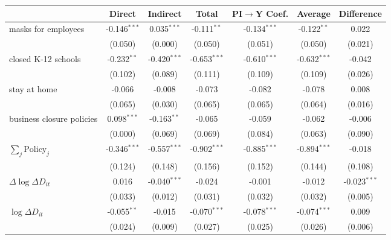 
\begin{tabular}{lccccc|>{}c}
\toprule
  & Direct & Indirect & Total & PI$\to$Y Coef. & Average & Difference\\
\midrule
masks for employees & -0.146$^{***}$ & 0.035$^{***}$ & -0.111$^{**}$ & -0.134$^{***}$ & -0.122$^{**}$ & 0.022\\
 & (0.050) & (0.000) & (0.050) & (0.051) & (0.050) & (0.021)\\
closed K-12 schools & -0.232$^{**}$ & -0.420$^{***}$ & -0.653$^{***}$ & -0.610$^{***}$ & -0.632$^{***}$ & -0.042\\
 & (0.102) & (0.089) & (0.111) & (0.109) & (0.109) & (0.026)\\
stay at home & -0.066 & -0.008 & -0.073 & -0.082 & -0.078 & 0.008\\
 & (0.065) & (0.030) & (0.065) & (0.065) & (0.064) & (0.016)\\
business closure policies & 0.098$^{***}$ & -0.163$^{**}$ & -0.065 & -0.059 & -0.062 & -0.006\\
 & (0.000) & (0.069) & (0.069) & (0.084) & (0.063) & (0.090)\\
$\sum_j \mathrm{Policy}_j$ & -0.346$^{***}$ & -0.557$^{***}$ & -0.902$^{***}$ & -0.885$^{***}$ & -0.894$^{***}$ & -0.018\\
 & (0.124) & (0.148) & (0.156) & (0.152) & (0.144) & (0.108)\\
$\Delta \log \Delta D_{it}$ & 0.016 & -0.040$^{***}$ & -0.024 & -0.001 & -0.012 & -0.023$^{***}$\\
 & (0.033) & (0.012) & (0.031) & (0.032) & (0.032) & (0.005)\\
$\log \Delta D_{it}$ & -0.055$^{**}$ & -0.015 & -0.070$^{***}$ & -0.078$^{***}$ & -0.074$^{***}$ & 0.009\\
 & (0.024) & (0.009) & (0.027) & (0.025) & (0.026) & (0.006)\\
\bottomrule
\end{tabular}